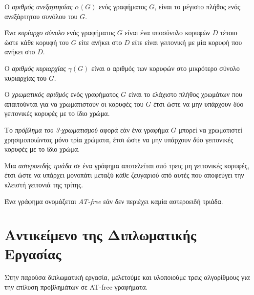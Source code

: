 \begin{definition}
	Ο \textit{αριθμός ανεξαρτησίας} $\alpha(G)$ ενός γραφήματος $G$, είναι το μέγιστο πλήθος ενός ανεξάρτητου συνόλου του $G$.
\end{definition}

\begin{definition}
	Ένα \textit{κυρίαρχο σύνολο} ενός γραφήματος $G$ είναι ένα υποσύνολο κορυφών $D$ τέτοιο ώστε κάθε κορυφή του $G$ είτε ανήκει στο $D$ είτε είναι γειτονική με μία κορυφή που ανήκει στο $D$.
\end{definition}

\begin{definition}
	Ο \textit{αριθμός κυριαρχίας} $\gamma(G)$ είναι ο αριθμός των κορυφών στο μικρότερο σύνολο κυριαρχίας του $G$.
\end{definition}

\begin{definition}
	Ο \textit{χρωματικός αριθμός} ενός γραφήματος $G$ είναι το ελάχιστο πλήθος χρωμάτων που απαιτούνται για να χρωματιστούν οι κορυφές του $G$ έτσι ώστε να μην υπάρχουν δύο γειτονικές κορυφές με το ίδιο χρώμα.
\end{definition}

\begin{definition}
	Το \textit{πρόβλημα του 3-χρωματισμού} αφορά εάν ένα γραφήμα $G$ μπορεί να χρωματιστεί χρησιμοποιώντας μόνο τρία χρώματα, έτσι ώστε να μην υπάρχουν δύο γειτονικές κορυφές με το ίδιο χρώμα.
\end{definition}

\begin{definition}
	Μια \textit{αστεροειδής τριάδα} σε ένα γράφημα αποτελείται από τρεις μη γειτονικές κορυφές, έτσι ώστε να υπάρχει μονοπάτι μεταξύ κάθε ζευγαριού από αυτές που αποφεύγει την κλειστή γειτονιά της τρίτης. 
\end{definition}

\begin{definition}
	Ένα γράφημα ονομάζεται \textit{AT-free} εάν δεν περιέχει καμία αστεροειδή τριάδα.
\end{definition}



\section{Αντικείμενο της Διπλωματικής Εργασίας}
\label{sec:Thesis_Subject}

Στην παρούσα διπλωματική εργασία, μελετούμε  και υλοποιούμε τρεις αλγορίθμους για την επίλυση προβλημάτων σε AT-free γραφήματα.

